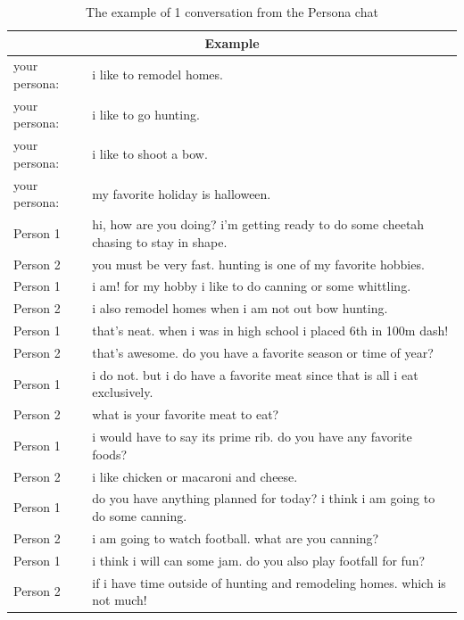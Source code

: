 \begin{table}[t]
\centering
 \begin{tabular}{|p{3cm}|p{8cm}|} 
 \hline
 \multicolumn{2}{|c|}{Example} \\
 \hline
 your persona: & i like to remodel homes. \\ 
 \hline
 your persona: & i like to go hunting. \\
 \hline
 your persona: & i like to shoot a bow. \\
 \hline
 your persona: & my favorite holiday is halloween. \\
 \hline
 Person 1 & hi, how are you doing? i'm getting ready to do some cheetah chasing to stay in shape. \\
 \hline
 Person 2 & you must be very fast. hunting is one of my favorite hobbies. \\
 \hline
 Person 1 & i am! for my hobby i like to do canning or some whittling. \\ 
 \hline
 Person 2 & i also remodel homes when i am not out bow hunting. \\
 \hline
 Person 1 & that's neat. when i was in high school i placed 6th in 100m dash! \\
 \hline
 Person 2 & that's awesome. do you have a favorite season or time of year? \\
 \hline
 Person 1 & i do not. but i do have a favorite meat since that is all i eat exclusively. \\
 \hline
 Person 2 & what is your favorite meat to eat? \\
 \hline
 Person 1 & i would have to say its prime rib. do you have any favorite foods? \\
 \hline 
 Person 2 & i like chicken or macaroni and cheese. \\
 \hline 
 Person 1 & do you have anything planned for today? i think i am going to do some canning. \\
 \hline 
 Person 2 & i am going to watch football. what are you canning? \\
 \hline 
 Person 1 & i think i will can some jam. do you also play footfall for fun? \\
 \hline 
 Person 2 & if i have time outside of hunting and remodeling homes. which is not much! \\
 \hline 
 \end{tabular}
 \caption{The example of 1 conversation from the Persona chat}
\label{tab:persona_chat}
\end{table}

